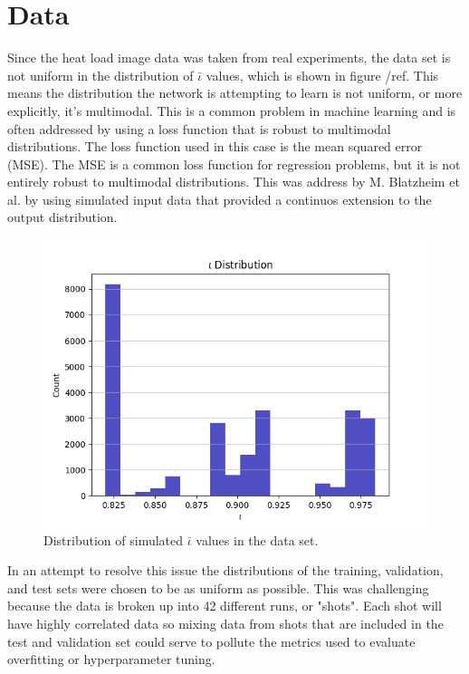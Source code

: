 
\chapter{Data}
\label{sec:Head Load Data}


Since the heat load image data was taken from real experiments, the data set is not uniform in the distribution of $\bar{\iota}$ values, which is shown in figure /ref{}. This means the distribution the network is attempting to learn is not uniform, or more explicitly, it's multimodal. This is a common problem in machine learning and is often addressed by using a loss function that is robust to multimodal distributions. The loss function used in this case is the mean squared error (MSE). The MSE is a common loss function for regression problems, but it is not entirely robust to multimodal distributions. This was address by M. Blatzheim et al. \cite{Blatzheim_2018} by using simulated input data that provided a continuos extension to the output distribution.

\begin{figure}[htb]
	\includegraphics[width=\textwidth]{images/iota-dist.png}
	\caption{Distribution of simulated $\bar{\iota}$ values in the data set.}
	\label{fig:data:iota_dist}
\end{figure}

In an attempt to resolve this issue the distributions of the training, validation, and test sets were chosen to be as uniform as possible. This was challenging because the data is broken up into 42 different runs, or "shots". Each shot will have highly correlated data so mixing data from shots that are included in the test and validation set could serve to pollute the metrics used to evaluate overfitting or hyperparameter tuning.